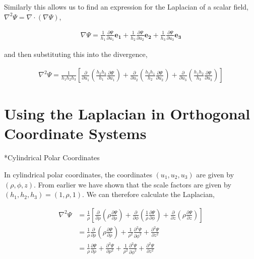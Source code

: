 \documentclass[11pt]{amsart}
\makeatletter
\def\subsection{\@startsection{subsection}{3}%
  \z@{.5\linespacing\@plus.7\linespacing}{.1\linespacing}%
  {\normalfont\itshape}}
\makeatother
\begin{document}
Similarly this allows us to find an expression for the Laplacian of a scalar field, $\nabla^2 \Psi = \nabla \cdot (\nabla \Psi)$,

\begin{align*}
  \nabla\Psi = \frac{1}{h_1}\frac{\partial\Psi}{\partial u_1} \mathbf{e_1} + \frac{1}{h_2}\frac{\partial\Psi}{\partial u_2} \mathbf{e_2} + \frac{1}{h_3}\frac{\partial\Psi}{\partial u_3} \mathbf{e_3}
\end{align*}

and then substituting this into the divergence,

\begin{align*}
  \nabla^2\Psi = \frac{1}{h_1h_2h_3}\left[\frac{\partial}{\partial u_1}\left(\frac{h_2h_3}{h_1}\frac{\partial\Psi}{\partial u_1}\right) + \frac{\partial}{\partial u_2}\left(\frac{h_3h_1}{h_2}\frac{\partial\Psi}{\partial u_2}\right) + \frac{\partial}{\partial u_3}\left(\frac{h_1h_2}{h_3}\frac{\partial\Psi}{\partial u_3}\right)\right]
\end{align*}

\section{Using the Laplacian in Orthogonal Coordinate Systems}

\subsection*{Cylindrical Polar Coordinates}

In cylindrical polar coordinates, the coordinates $(u_1, u_2, u_3)$ are given by $(\rho, \phi, z)$. From earlier we have shown that the scale factors are given by $(h_1, h_2, h_3) = (1, \rho, 1)$. We can therefore calculate the Laplacian,

\begin{align*}
  \nabla^2\Psi&=\frac{1}{\rho}\left[\frac{\partial}{\partial\rho}\left(\rho\frac{\partial\Psi}{\partial\rho}\right) + \frac{\partial}{\partial\phi}\left(\frac{1}{\rho}\frac{\partial\Psi}{\partial\phi}\right) + \frac{\partial}{\partial z}\left(\rho\frac{\partial\Psi}{\partial z}\right)\right] \\
              &=\frac{1}{\rho}\frac{\partial}{\partial\rho}\left(\rho\frac{\partial\Psi}{\partial\rho}\right) + \frac{1}{\rho^2}\frac{\partial^2\Psi}{\partial\phi^2} + \frac{\partial^2\Psi}{\partial z^2} \\
              &=\frac{1}{\rho}\frac{\partial\Psi}{\partial\rho}+\frac{\partial^2\Psi}{\partial\rho^2}+\frac{1}{\rho^2}\frac{\partial^2\Psi}{\partial\phi^2} + \frac{\partial^2\Psi}{\partial z^2}
\end{align*}
\end{document}
